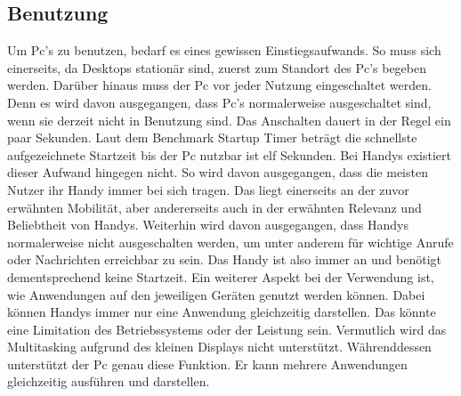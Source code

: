 \subsection{Benutzung}\myCheckmark
	Um Pc's zu benutzen, bedarf es eines gewissen Einstiegsaufwands. %
		So muss sich einerseits, da Desktops stationär sind, zuerst zum Standort des Pc's begeben werden. %
		Darüber hinaus muss der Pc vor jeder Nutzung eingeschaltet werden. Denn es wird davon ausgegangen, dass Pc's normalerweise ausgeschaltet sind, wenn sie derzeit nicht in Benutzung sind. Das Anschalten dauert in der Regel ein paar Sekunden. Laut dem Benchmark \glqq Startup Timer\grqq{} beträgt die schnellste aufgezeichnete Startzeit bis der Pc nutzbar ist elf Sekunden\cite{pcVsphone_boottime}.\newline%
	Bei Handys existiert dieser Aufwand hingegen nicht. %
		So wird davon ausgegangen, dass die meisten Nutzer ihr Handy immer bei sich tragen. Das liegt einerseits an der zuvor erwähnten Mobilität, aber andererseits auch in der  erwähnten Relevanz und Beliebtheit von Handys. %
		Weiterhin wird davon ausgegangen, dass Handys normalerweise nicht ausgeschalten werden, um unter anderem für wichtige Anrufe oder Nachrichten erreichbar zu sein. Das Handy ist also immer an und benötigt dementsprechend keine Startzeit.\newline%
Ein weiterer Aspekt bei der Verwendung ist, wie Anwendungen auf den jeweiligen Geräten genutzt werden können. %
	Dabei können Handys immer nur eine Anwendung gleichzeitig darstellen. Das könnte eine Limitation des Betriebssystems oder der Leistung sein. Vermutlich wird das Multitasking aufgrund des kleinen Displays nicht unterstützt.\newline%
	Währenddessen unterstützt der Pc genau diese Funktion. Er kann mehrere Anwendungen gleichzeitig ausführen und darstellen.%
	
	
